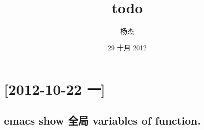 \documentclass[11pt]{article}
\title{todo}
\author{杨杰}
\date{29 十月 2012}
\begin{document}
\maketitle

\setcounter{tocdepth}{3}
\tableofcontents
\vspace*{1cm}
\section{[2012-10-22 一]}
\label{sec-1}

\subsection{emacs show 全局 variables of function.}
\label{sec-1.1}
\end{document}
